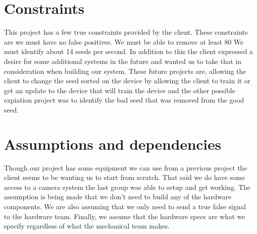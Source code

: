 \documentclass[onecolumn, draftclsnofoot,10pt, compsoc]{IEEEtran}
\begin{document}
\section{Constraints}
This project has a few true constraints provided by the client.
These constraints are we must have no false positives. We must be able to remove at least 80%
We must identify about 14 seeds per second.
In addition to this the client expressed a desire for some additional systems in the future and wanted us to take that in consideration when building our system.
These future projects are, allowing the client to change the seed sorted on the device by allowing the client to train it or get an update to the device that will train the device and the other possible expiation project was to identify the bad seed that was removed from the good seed.
\section{Assumptions and dependencies}
Though our project has some equipment we can use from a previous project the client seems to be wanting us to start from scratch.
That said we do have some access to a camera system the last group was able to setup and get working.
The assumption is being made that we don’t need to build any of the hardware components.
We are also assuming that we only need to send a true false signal to the hardware team.
Finally, we assume that the hardware specs are what we specify regardless of what the mechanical team makes.
\end{document}
